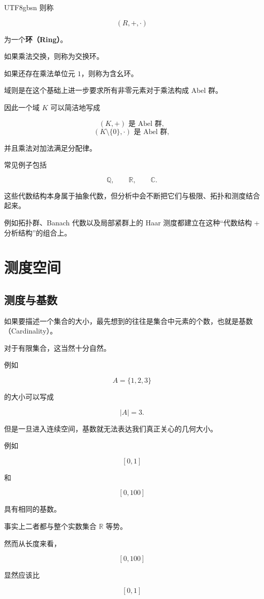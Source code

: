 \documentclass[11pt]{article}
\begin{document}
\begin{CJK*}{UTF8}{gbsn}
则称

\[
(R,+,\cdot)
\]

为一个\textbf{环（Ring）}。

如果乘法交换，则称为交换环。

如果还存在乘法单位元 $1$，则称为含幺环。

域则是在这个基础上进一步要求所有非零元素对于乘法构成 Abel 群。

因此一个域 $K$ 可以简洁地写成

\[
(K,+)\text{ 是 Abel 群},
\]
\[
(K\setminus\{0\},\cdot)\text{ 是 Abel 群},
\]

并且乘法对加法满足分配律。

常见例子包括

\[
\mathbb{Q},\qquad\mathbb{R},\qquad\mathbb{C}.
\]

这些代数结构本身属于抽象代数，但分析中会不断把它们与极限、拓扑和测度结合起来。

例如拓扑群、Banach 代数以及局部紧群上的 Haar 测度都建立在这种“代数结构 + 分析结构”的组合上。

\section{测度空间}

\subsection{测度与基数}

如果要描述一个集合的大小，最先想到的往往是集合中元素的个数，也就是基数（Cardinality）。

对于有限集合，这当然十分自然。

例如

\[
A=\{1,2,3\}
\]

的大小可以写成

\[
|A|=3.
\]

但是一旦进入连续空间，基数就无法表达我们真正关心的几何大小。

例如

\[
[0,1]
\]

和

\[
[0,100]
\]

具有相同的基数。

事实上二者都与整个实数集合 $\mathbb{R}$ 等势。

然而从长度来看，

\[
[0,100]
\]

显然应该比

\[
[0,1]
\]


\end{CJK*}
\end{document}
